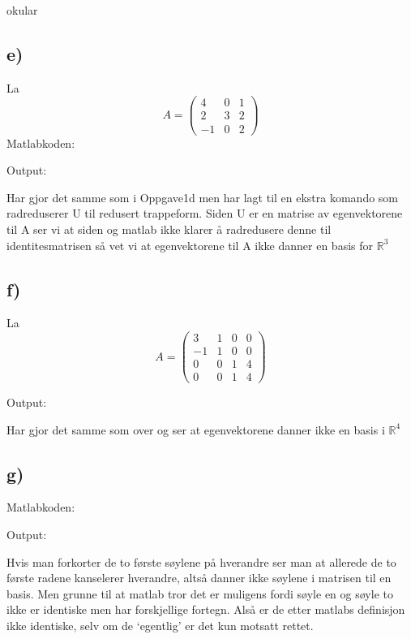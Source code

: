 okular\documentclass[a4paper, norsk, twoside, 10pt]{article}
\begin{document}
\subsection*{e)}

\def\matriseAE{
  \begin{pmatrix}
    4 & 0 & 1 \\
    2 & 3 & 2 \\
    -1 & 0 & 2
  \end{pmatrix}
}

La \[A = \matriseAE\]
Matlabkoden:

Output:


Har gjor det samme som i Oppgave1d men har lagt til en ekstra komando som radreduserer U til redusert trappeform. Siden U er en matrise av egenvektorene til A ser vi at siden og matlab ikke klarer å radredusere denne til identitesmatrisen så vet vi at egenvektorene til A ikke danner en basis for $\mathbb{R}^{3}$

\newpage

\subsection*{f)}
\def\matriseAF{
  \begin{pmatrix}
    3 & 1 & 0 & 0 \\
    -1 & 1 & 0 & 0 \\
    0 & 0 & 1 & 4 \\
    0 & 0 & 1 & 4 
  \end{pmatrix}
}
La \[A = \matriseAF \]

Output:


Har gjor det samme som over og ser at egenvektorene danner ikke en basis i $\mathbb{R}^{4}$



\subsection*{g)}
Matlabkoden:

Output:


Hvis man forkorter de to første søylene på hverandre ser man at allerede de to første radene kanselerer hverandre, altså danner ikke søylene i matrisen til en basis. Men grunne til at matlab tror det er muligens fordi søyle en og søyle to ikke er identiske men har forskjellige fortegn. Alså er de etter matlabs definisjon ikke identiske, selv om de `egentlig' er det kun motsatt rettet.
\end{document}
